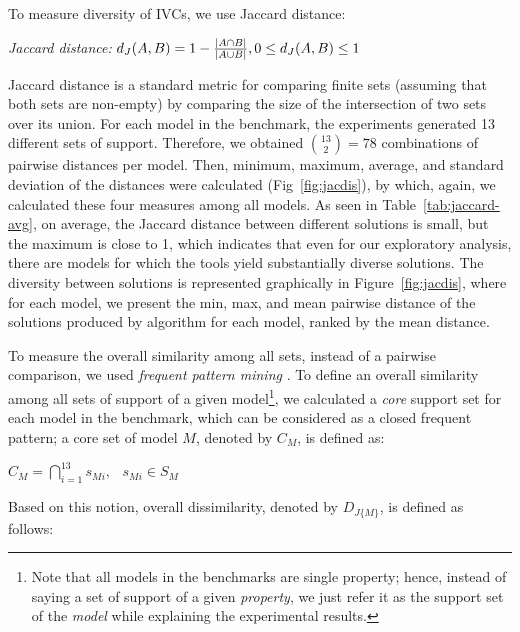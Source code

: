 To measure diversity of IVCs, we use Jaccard distance:
\begin{definition}{\emph{Jaccard distance:}}
  \label{def:dj}
  $d_J(\small{A}, \small{B}) = 1 - \frac{|A \cap B|}{|A \cup B|} ,\\ 0 \leq d_J(\small{A}, \small{B}) \leq 1$
\end{definition}
\noindent Jaccard distance is a standard metric for comparing finite sets (assuming that both sets are non-empty) by comparing the size of the intersection of two sets over its union.  For each model in the benchmark, the experiments generated 13 different sets of support. Therefore, we obtained $\binom{13}{2} = 78$ combinations of pairwise distances per model. Then, minimum, maximum, average, and standard deviation of the distances were calculated (Fig~\ref{fig:jacdis}), by which, again, we calculated these four measures among all models.  As seen in Table~\ref{tab:jaccard-avg}, on average, the Jaccard distance between different solutions is small, but the maximum is close to 1, which indicates that even for our exploratory analysis, there are models for which the tools yield substantially diverse solutions.  The diversity between solutions is represented graphically in Figure~\ref{fig:jacdis}, where for each model, we present the min, max, and mean pairwise distance of the solutions produced by algorithm \ucalg for each model, ranked by the mean distance.

\iffalse
{}

To measure the overall similarity among all sets, instead of a pairwise comparison, we used \emph{frequent pattern mining} \cite{han2007frequent}. To define an overall similarity among all sets of support of a given model\footnote{Note that all models in the benchmarks are single property; hence, instead of saying a set of support of a given \emph{property}, we just refer it as the support set of the \emph{model} while explaining the experimental results.}, we calculated a \emph{core} support set for each model in the benchmark, which can be considered as a closed frequent pattern; a core set of model $M$, denoted by $C_M$, is defined as:
\begin{definition}
  \label{def:core}
  $C_M = \bigcap_{i=1}^{13} s_{Mi},   \hspace{9pt} s_{Mi} \in S_M$
\end{definition}

Based on this notion, overall dissimilarity, denoted by $D_{J\{M\}}$, is defined as follows:

